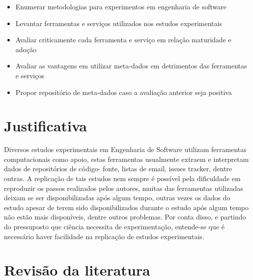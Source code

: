 \documentclass[12pt]{article}
\begin{document}
\begin{itemize}
\item Enumerar metodologias para experimentos em engenharia de software
\item Levantar ferramentas e serviços utilizados nos estudos experimentais
\item Avaliar criticamente cada ferramenta e serviço em relação maturidade e adoção
\item Avaliar as vantagens em utilizar meta-dados em detrimentos das ferramentas e serviços
\item Propor repositório de meta-dados caso a avaliação anterior seja positiva
\end{itemize}

\section{Justificativa}

Diversos estudos experimentais em Engenharia de Software utilizam ferramentas
computacionais como apoio, estas ferramentas usualmente extraem e interpretam
dados de repositórios de código- fonte, listas de email, issues tracker,
dentre outras. A replicação de tais estudos nem sempre é possível pela
dificuldade em reproduzir os passos realizados pelos autores, muitas das
ferramentas utilizadas deixam se ser disponibilizadas após algum tempo, outras
vezes os dados do estudo apesar de terem sido disponibilizados durante o
estudo após algum tempo não estão mais disponíveis, dentre outros problemas.
Por conta disso, e partindo do pressuposto que ciência necessita de
experimentação, entende-se que é necessário haver facilidade na replicação de
estudos experimentais.

\section{Revisão da literatura}
\end{document}
